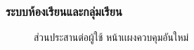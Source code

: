 \documentclass[12pt,one side,openright,a4paper]{cpe-thesis-th}
\begin{document}
            \subsubsection{ระบบห้องเรียนและกลุ่มเรียน}
                \begin{figure}[H]
                \centering
                \caption[ส่วนประสานต่อผู้ใช้ หน้าเเผงควบคุมอันใหม่]{ส่วนประสานต่อผู้ใช้ หน้าเเผงควบคุมอันใหม่}\label{fig:new-ui-dashboard1}
                \end{figure}
        
\end{document}
